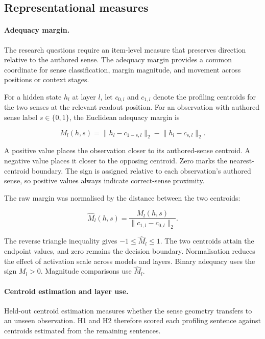\documentclass[conference]{IEEEtran}
\begin{document}
\subsection{Representational measures}
\label{sec:representational-measures}

\paragraph{Adequacy margin.}
The research questions require an item-level measure that preserves direction
relative to the authored sense. The adequacy margin provides a common
coordinate for sense classification, margin magnitude, and movement across
positions or context stages.

For a hidden state $h_l$ at layer $l$, let $c_{0,l}$ and $c_{1,l}$ denote the
profiling centroids for the two senses at the relevant readout position. For an
observation with authored sense label $s\in\{0,1\}$, the Euclidean adequacy
margin is

\begin{equation}
M_l(h,s)=
\lVert h_l-c_{1-s,l}\rVert_2
-
\lVert h_l-c_{s,l}\rVert_2.
\label{eq:margin}
\end{equation}

A positive value places the observation closer to its authored-sense centroid.
A negative value places it closer to the opposing centroid. Zero marks the
nearest-centroid boundary. The sign is assigned relative to each observation's
authored sense, so positive values always indicate correct-sense proximity.

The raw margin was normalised by the distance between the two centroids:

\begin{equation}
\widehat{M}_l(h,s)=
\frac{M_l(h,s)}
{\lVert c_{1,l}-c_{0,l}\rVert_2}.
\label{eq:margin-norm}
\end{equation}

The reverse triangle inequality gives
$-1\leq\widehat{M}_l\leq1$. The two centroids attain the endpoint values, and
zero remains the decision boundary. Normalisation reduces the effect of
activation scale across models and layers. Binary adequacy uses the sign
$M_l>0$. Magnitude comparisons use $\widehat{M}_l$.

\paragraph{Centroid estimation and layer use.}
Held-out centroid estimation measures whether the sense geometry transfers to
an unseen observation. H1 and H2 therefore scored each profiling sentence
against centroids estimated from the remaining sentences.
\end{document}
